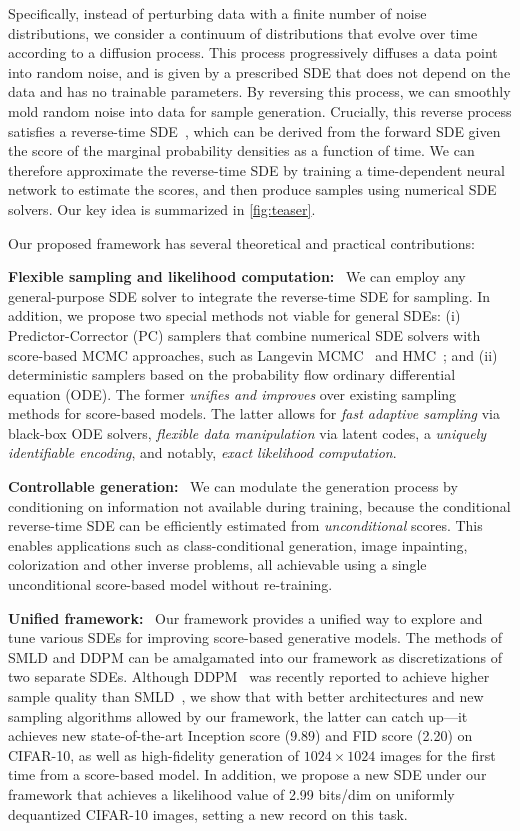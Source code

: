 Specifically, instead of perturbing data with a finite number of noise distributions, we consider a continuum of distributions that evolve over time according to a diffusion process. This process progressively diffuses a data point into random noise, and is given by a prescribed SDE that does not depend on the data and has no trainable parameters. 
By reversing this process, we can smoothly mold random noise into data for sample generation. Crucially, this reverse process satisfies a reverse-time SDE~\citep{Anderson1982-ny}, which can be derived from the forward SDE given the score of the marginal probability densities as a function of time. We can therefore approximate the reverse-time SDE by training a time-dependent neural network to estimate the scores, and then produce samples using numerical SDE solvers. Our key idea is summarized in \cref{fig:teaser}.

Our proposed framework has several theoretical and practical contributions: %

\textbf{Flexible sampling and likelihood computation:}~ We can employ any general-purpose SDE solver to integrate the reverse-time SDE for sampling. In addition, we propose two special methods not viable for general SDEs: (i) Predictor-Corrector (PC) samplers that combine numerical SDE solvers with score-based MCMC approaches, such as Langevin MCMC~\citep{parisi1981correlation} and HMC~\citep{neal2011mcmc}; and (ii) deterministic samplers based on the probability flow ordinary differential equation (ODE). The former \emph{unifies and improves} over existing sampling methods for score-based models. The latter allows for \emph{fast adaptive sampling} via black-box ODE solvers, \emph{flexible data manipulation} via latent codes, a \emph{uniquely identifiable encoding}, and notably, \emph{exact likelihood computation}.

\textbf{Controllable generation:}~ We can modulate the generation process by conditioning on information not available during training, because the conditional reverse-time SDE can be efficiently estimated from \emph{unconditional} scores. This enables applications such as class-conditional generation, image inpainting, colorization and other inverse problems, all achievable using a single unconditional score-based model without re-training.


\textbf{Unified framework:}~ Our framework provides a unified way to explore and tune various SDEs for improving score-based generative models.
The methods of SMLD and DDPM can be amalgamated into our framework as discretizations of two separate SDEs. 
Although DDPM~\citep{ho2020denoising} was recently reported to achieve higher sample quality than SMLD~\citep{song2019generative,song2020improved}, we show that with better architectures and new sampling algorithms allowed by our framework, the latter can catch up---it achieves new state-of-the-art Inception score (9.89) and FID score (2.20) on CIFAR-10, as well as high-fidelity generation of $1024\times 1024$ images for the first time from a score-based model. In addition, we propose a new SDE under our framework that achieves a likelihood value of 2.99 bits/dim on uniformly dequantized CIFAR-10 images, setting a new record on this task.

